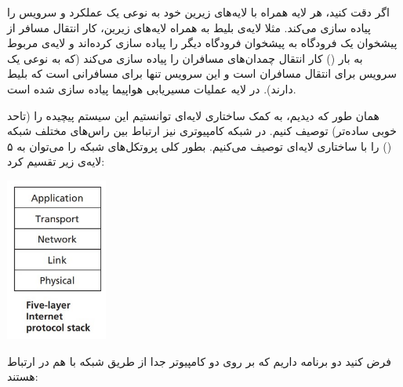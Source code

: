 \documentclass[]{article}
\begin{document}
اگر دقت کنید، هر لایه همراه با لایه‌های زیرین خود به نوعی یک عملکرد و سرویس را پیاده سازی می‌کند. مثلا لایه‌ی بلیط به همراه لایه‌های زیرین، کار انتقال مسافر از پیشخوان یک فرودگاه به پیشخوان فرودگاه دیگر را پیاده سازی کرده‌اند و لایه‌ی مربوط به بار ()‌ کار انتقال چمدان‌های مسافران را پیاده سازی می‌کند (که به نوعی یک سرویس برای انتقال مسافران است و این سرویس تنها برای مسافرانی است که بلیط دارند). در لایه  عملیات مسیریابی هواپیما پیاده سازی شده است.

همان طور که دیدیم، به کمک ساختاری لایه‌ای توانستیم این سیستم پیچیده را (‌تاحد خوبی ساده‌تر) توصیف کنیم. در شبکه کامپیوتری نیز ارتباط بین راس‌های مختلف شبکه () را با ساختاری لایه‌ای توصیف می‌کنیم. بطور کلی پروتکل‌های شبکه را می‌توان به ۵ لایه‌ی زیر تقسیم کرد:


\begin{center}
\includegraphics[width=0.25\textwidth]{images/3.jpg}
\end{center}


فرض کنید دو برنامه داریم که بر روی دو کامپیوتر جدا از طریق شبکه با هم در ارتباط هستند:
\end{document}
